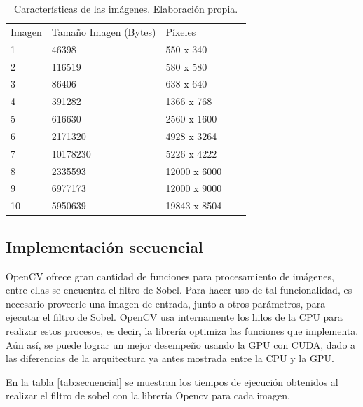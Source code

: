 \documentclass[10pt,journal,compsoc]{IEEEtran}
\begin{document}
\begin{table}[ht]
\centering
\caption{Características de las imágenes. Elaboración propia.}
\label{tab:caracteristicas}
\begin{tabular}{lllll}

Imagen & Tamaño Imagen (Bytes) & Píxeles      &  &  \\
1      & 46398                 & 550 x 340    &  &  \\
2      & 116519                & 580 x 580    &  &  \\
3      & 86406                 & 638 x 640    &  &  \\
4      & 391282                & 1366 x 768   &  &  \\
5      & 616630                & 2560 x 1600  &  &  \\
6      & 2171320               & 4928 x 3264  &  &  \\
7      & 10178230              & 5226 x 4222  &  &  \\
8      & 2335593               & 12000 x 6000 &  &  \\
9      & 6977173               & 12000 x 9000 &  &  \\
10     & 5950639               & 19843 x 8504 &  & 
\end{tabular}
\end{table}


\subsection{Implementación secuencial}

OpenCV ofrece gran cantidad de funciones para procesamiento de imágenes, entre ellas se encuentra el filtro de Sobel. Para hacer uso de tal funcionalidad, es necesario proveerle una imagen de entrada, junto a otros parámetros, para ejecutar el filtro de Sobel. OpenCV usa internamente los hilos de la CPU para realizar estos procesos, es decir, la librería optimiza las funciones que implementa. Aún así, se puede lograr un mejor desempeño usando la GPU con CUDA, dado a las diferencias de la arquitectura ya antes mostrada entre la CPU y la GPU.

En la tabla \ref{tab:secuencial}  se muestran los tiempos de ejecución obtenidos al realizar el filtro de sobel con la librería Opencv para cada imagen. 
\end{document}
